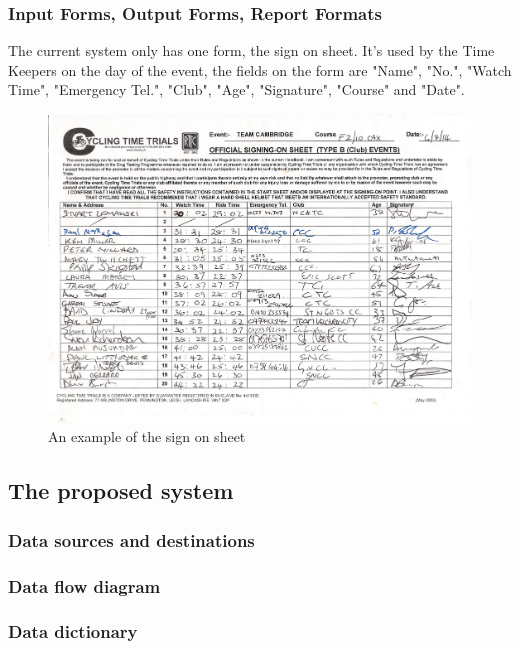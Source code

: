 



\subsubsection{Input Forms, Output Forms, Report Formats}
The current system only has one form, the sign on sheet. It's used by the Time Keepers on the day of the event, the fields on the form are "Name", "No.", "Watch Time", "Emergency Tel.", "Club", "Age", "Signature", "Course" and "Date".

\begin{figure}[H]
    \includegraphics[width=\textwidth]{./SignOnTimeKeepersSheet.pdf}
    \caption{An example of the sign on sheet} \label{fig:Sign on Sheet}
\end{figure}
\subsection{The proposed system}

\subsubsection{Data sources and destinations}

\subsubsection{Data flow diagram}

\subsubsection{Data dictionary}

